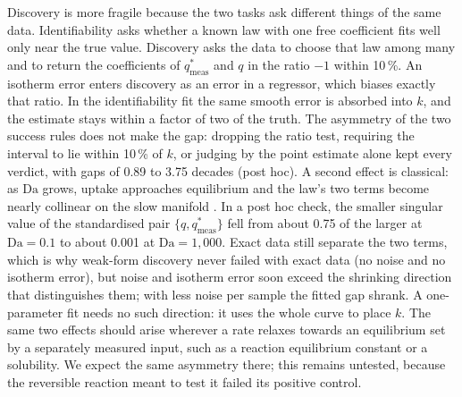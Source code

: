 \documentclass[11pt]{article}
\newcommand{\Da}{\mathrm{Da}}
\newcommand{\qsm}{q^{*}_{\mathrm{meas}}}
\begin{document}
Discovery is more fragile because the two tasks ask different things of the same data.
Identifiability asks whether a known law with one free coefficient fits well only near the true
value. Discovery asks the data to choose that law among many and to return the coefficients of
$\qsm$ and $q$ in the ratio $-1$ within 10\,\%. An isotherm
error enters discovery as an error in a regressor, which biases exactly that ratio. In the
identifiability fit the same smooth error is absorbed into $k$, and the estimate stays within a
factor of two of the truth.
The asymmetry of the two success rules does not make the gap: dropping the ratio test, requiring
the interval to lie within 10\,\% of $k$, or judging by the point estimate alone kept every verdict,
with gaps of 0.89 to 3.75 decades (post hoc).
A second effect is classical: as $\Da$ grows, uptake approaches equilibrium and the law's two
terms become nearly collinear on the slow manifold \citep{delgado2025,gallo2026}. In a post hoc
check, the smaller singular value of the standardised pair $\{q, \qsm\}$ fell from about 0.75 of
the larger at $\Da = 0.1$ to about 0.001 at $\Da = 1{,}000$. Exact data still separate the two terms,
which is why weak-form discovery never failed with exact data (no noise and no isotherm error), but noise and
isotherm error soon exceed the shrinking direction that distinguishes them; with less noise per sample the
fitted gap shrank. A one-parameter fit
needs no such direction: it uses the whole curve to place $k$. The same two effects should arise wherever a rate relaxes towards an equilibrium set by a separately
measured input, such as a reaction equilibrium constant or a solubility. We expect the same asymmetry
there; this remains untested, because the reversible reaction meant to test it failed its positive control.
\end{document}
